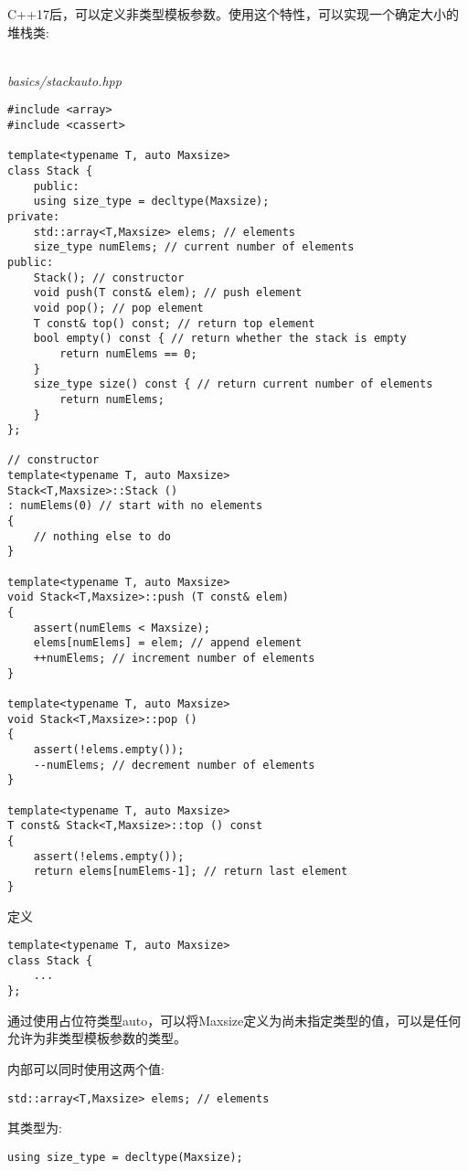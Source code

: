 C++17后，可以定义非类型模板参数。使用这个特性，可以实现一个确定大小的堆栈类:

\hspace*{\fill} \\ %
\noindent
\textit{basics/stackauto.hpp}
\begin{lstlisting}[style=styleCXX]
#include <array>
#include <cassert>

template<typename T, auto Maxsize>
class Stack {
	public:
	using size_type = decltype(Maxsize);
private:
	std::array<T,Maxsize> elems; // elements
	size_type numElems; // current number of elements
public:
	Stack(); // constructor
	void push(T const& elem); // push element
	void pop(); // pop element
	T const& top() const; // return top element
	bool empty() const { // return whether the stack is empty
		return numElems == 0;
	}
	size_type size() const { // return current number of elements
		return numElems;
	}
};

// constructor
template<typename T, auto Maxsize>
Stack<T,Maxsize>::Stack ()
: numElems(0) // start with no elements
{
	// nothing else to do
}

template<typename T, auto Maxsize>
void Stack<T,Maxsize>::push (T const& elem)
{
	assert(numElems < Maxsize);
	elems[numElems] = elem; // append element
	++numElems; // increment number of elements
}

template<typename T, auto Maxsize>
void Stack<T,Maxsize>::pop ()
{
	assert(!elems.empty());
	--numElems; // decrement number of elements
}

template<typename T, auto Maxsize>
T const& Stack<T,Maxsize>::top () const
{
	assert(!elems.empty());
	return elems[numElems-1]; // return last element
}
\end{lstlisting}

定义

\begin{lstlisting}[style=styleCXX]
template<typename T, auto Maxsize>
class Stack {
	...
};
\end{lstlisting}

通过使用占位符类型auto，可以将Maxsize定义为尚未指定类型的值，可以是任何允许为非类型模板参数的类型。

内部可以同时使用这两个值:

\begin{lstlisting}[style=styleCXX]
std::array<T,Maxsize> elems; // elements
\end{lstlisting}

其类型为:

\begin{lstlisting}[style=styleCXX]
using size_type = decltype(Maxsize);
\end{lstlisting}

